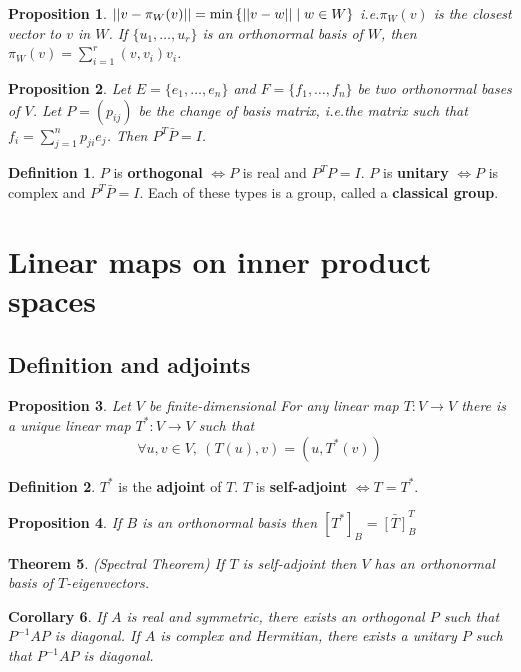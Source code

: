 \documentclass[12pt]{article}
\newtheorem{thm}{Theorem}[section]
\newtheorem{cor}[thm]{Corollary}
\newtheorem{prop}[thm]{Proposition}
\theoremstyle{definition}
\newtheorem*{defn*}{Definition}
\DeclarePairedDelimiter\length{\lvert\lvert}{\rvert\rvert}
\begin{document}
\begin{prop}
	$\length{v - \pi_W(v)} = \min{\{\length{v - w} \mid w \in W\}}$ i.e.\@ $\pi_W(v)$ is the closest vector to $v$ in $W$. If $\{u_1, \ldots, u_r\}$ is an orthonormal basis of $W$, then $\pi_W(v) = \sum_{i = 1}^r(v, v_i)v_i$.
\end{prop}

\begin{prop}
	Let $E = \{e_1, \ldots, e_n\}$ and $F = \{f_1, \ldots, f_n\}$ be two orthonormal bases of $V$.
	Let $P = (p_{ij})$ be the change of basis matrix, i.e.\@ the matrix such that $f_i = \sum_{j = 1}^np_{ji}e_j$.
	Then $P^T\bar{P} = I$.
\end{prop}

\begin{defn*}
	$P$ is \textbf{orthogonal} $\iff P$ is real and $P^TP = I$.
	${P}$ is \textbf{unitary} $\iff P$ is complex and $P^T\bar{P} = I$.
	Each of these types is a group, called a \textbf{classical group}.
\end{defn*}

\section{Linear maps on inner product spaces}

\subsection{Definition and adjoints}

\begin{prop}
	Let $V$ be finite-dimensional
	For any linear map $T : V \to V$ there is a unique linear map $T^{\ast} : V \to V$ such that
	$$\forall u, v \in V,\ (T(u), v) = (u, T^{\ast}(v))$$
\end{prop}

\begin{defn*}
	$T^{\ast}$ is the \textbf{adjoint} of $T$. $T$ is \textbf{self-adjoint} $\iff T = T^{\ast}$.
\end{defn*}

\begin{prop}
	If $B$ is an orthonormal basis then $[T^{\ast}]_B = \bar{[T]}_B^T$ 
\end{prop}

\begin{thm}
	(Spectral Theorem)
	If $T$ is self-adjoint then $V$ has an orthonormal basis of $T$-eigenvectors.
\end{thm}

\begin{cor}
	If $A$ is real and symmetric, there exists an orthogonal $P$ such that $P^{-1}AP$ is diagonal.
	If $A$ is complex and Hermitian, there exists a unitary $P$ such that $P^{-1}AP$ is diagonal.
\end{cor}
\end{document}
